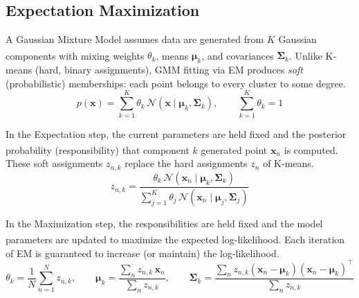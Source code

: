 \subsection{Expectation Maximization}

\begin{tcbitemize}[ skin=sectionraster ]
    \tcbitem[title=Gaussian Mixture Models (GMM), raster multicolumn=3]
    A Gaussian Mixture Model assumes data are generated from $K$ Gaussian components with mixing weights $\theta_k$, means $\boldsymbol{\mu}_k$, and covariances $\boldsymbol{\Sigma}_k$\textsuperscript{\cite[][p.175]{iiiCourseMachineLearning}}. Unlike K-means (hard, binary assignments), GMM fitting via EM produces \emph{soft} (probabilistic) memberships: each point belongs to every cluster to some degree.
    \tcblower
    \begin{equation}
        p(\mathbf{x}) = \sum_{k=1}^{K} \theta_k \,\mathcal{N}(\mathbf{x} \mid \boldsymbol{\mu}_k, \boldsymbol{\Sigma}_k), \qquad \sum_{k=1}^{K}\theta_k = 1
    \end{equation}

    \tcbitem[title={E-Step: Computing Responsibilities}, raster multicolumn=3]
    In the Expectation step, the current parameters are held fixed and the posterior probability (responsibility) that component $k$ generated point $\mathbf{x}_n$ is computed\textsuperscript{\cite[][pp.~175--177]{iiiCourseMachineLearning}}. These soft assignments $z_{n,k}$ replace the hard assignments $z_n$ of K-means.
    \tcblower
    \begin{equation}
        z_{n,k} = \frac{\theta_k \,\mathcal{N}(\mathbf{x}_n \mid \boldsymbol{\mu}_k, \boldsymbol{\Sigma}_k)}
                       {\displaystyle\sum_{j=1}^{K} \theta_j \,\mathcal{N}(\mathbf{x}_n \mid \boldsymbol{\mu}_j, \boldsymbol{\Sigma}_j)}
    \end{equation}

    \tcbitem[title={M-Step: Re-estimating Parameters}, raster multicolumn=6]
    In the Maximization step, the responsibilities are held fixed and the model parameters are updated to maximize the expected log-likelihood\textsuperscript{\cite[][pp.~177--178]{iiiCourseMachineLearning}}. Each iteration of EM is guaranteed to increase (or maintain) the log-likelihood.
    \tcblower
    \begin{equation}
        \theta_k = \frac{1}{N}\sum_{n=1}^{N} z_{n,k}, \qquad
        \boldsymbol{\mu}_k = \frac{\sum_n z_{n,k}\,\mathbf{x}_n}{\sum_n z_{n,k}}, \qquad
        \boldsymbol{\Sigma}_k = \frac{\sum_n z_{n,k}(\mathbf{x}_n - \boldsymbol{\mu}_k)(\mathbf{x}_n - \boldsymbol{\mu}_k)^\top}{\sum_n z_{n,k}}
    \end{equation}


\end{tcbitemize}
